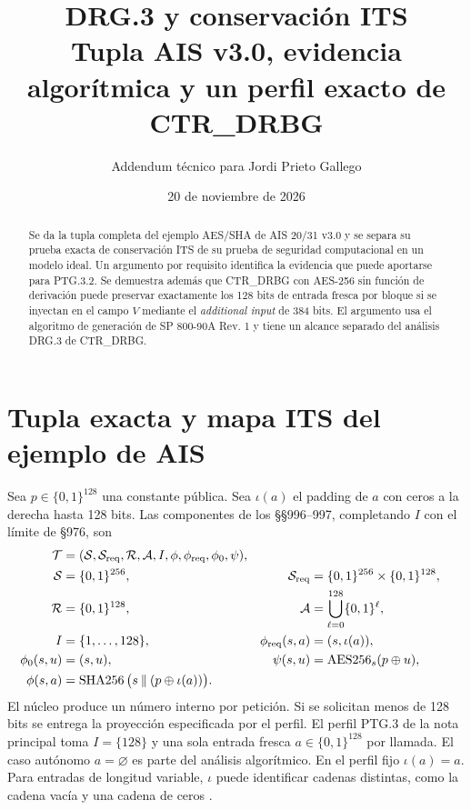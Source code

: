\documentclass[11pt,a4paper]{article}
\title{DRG.3 y conservación ITS\\
\large Tupla AIS v3.0, evidencia algorítmica y un perfil exacto de CTR\_DRBG}
\author{Addendum técnico para Jordi Prieto Gallego}
\date{20 de noviembre de 2026}
\newcommand{\bits}{\{0,1\}}
\newcommand{\AES}{\operatorname{AES256}}
\newcommand{\SHA}{\operatorname{SHA256}}
\begin{document}
\maketitle
\begin{abstract}
Se da la tupla completa del ejemplo AES/SHA de AIS 20/31 v3.0 y se separa
su prueba exacta de conservación ITS de su prueba de seguridad
computacional en un modelo ideal. Un argumento por requisito identifica
la evidencia que puede aportarse para PTG.3.2. Se demuestra además que
CTR\_DRBG con AES-256 sin función de derivación puede preservar
exactamente los 128 bits de entrada fresca por bloque si se inyectan
en el campo $V$ mediante el \emph{additional input} de 384 bits.
El argumento usa el algoritmo de generación de SP 800-90A Rev. 1
y tiene un alcance separado del análisis DRG.3 de CTR\_DRBG.
\end{abstract}

\section{Tupla exacta y mapa ITS del ejemplo de AIS}

Sea $p\in\bits^{128}$ una constante pública. Sea $\iota(a)$ el
padding de $a$ con ceros a la derecha hasta 128 bits. Las componentes
de los §§996--997, completando $I$ con el límite de §976, son
\[
\begin{aligned}
\mathcal T&=(\mathcal S,\mathcal S_{\rm req},\mathcal R,\mathcal A,
 I,\phi,\phi_{\rm req},\phi_0,\psi),\\
\mathcal S&=\bits^{256}, &
\mathcal S_{\rm req}&=\bits^{256}\times\bits^{128},\\
\mathcal R&=\bits^{128}, &
\mathcal A&=\bigcup_{\ell=0}^{128}\bits^\ell,\\
I&=\{1,\ldots,128\}, &
\phi_{\rm req}(s,a)&=(s,\iota(a)),\\
\phi_0(s,u)&=(s,u), &
\psi(s,u)&=\AES_s(p\oplus u),\\
\phi(s,a)&=\SHA\big(s\mathbin\|(p\oplus\iota(a))\big).
\end{aligned}
\]
El núcleo produce un número interno por petición. Si se solicitan menos
de 128 bits se entrega la proyección especificada por el perfil.
El perfil PTG.3 de la nota principal toma $I=\{128\}$ y una sola
entrada fresca $a\in\bits^{128}$ por llamada. El caso autónomo
$a=\varnothing$ es parte del análisis algorítmico. En el perfil fijo
$\iota(a)=a$. Para entradas de longitud variable, $\iota$ puede identificar
cadenas distintas, como la cadena vacía y una cadena de ceros
\cite[§§127--147, 976 y 996--998]{ais}.
\end{document}
